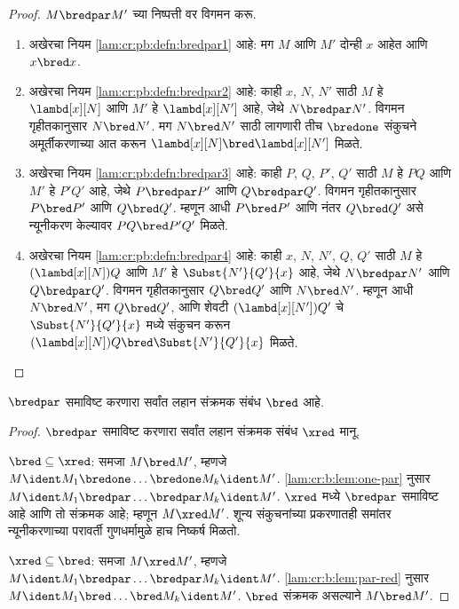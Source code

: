 \begin{proof} $M \bredpar M'$ च्या निष्पत्ती वर विगमन करू.
  \begin{enumerate}
  \item अखेरचा नियम \ref{lam:cr:pb:defn:bredpar1} आहे: मग $M$
    आणि $M'$ दोन्ही $x$ आहेत आणि $x \bred x$.
  \item अखेरचा नियम \ref{lam:cr:pb:defn:bredpar2} आहे: काही
    $x$, $N$, $N'$ साठी $M$ हे $\lambd[x][N]$
    आणि $M'$ हे $\lambd[x][N']$ आहे, जेथे
    $N \bredpar N'$. विगमन गृहीतकानुसार $N \bred N'$.
    मग $N \bred N'$ साठी लागणारी तीच $\bredone$
    संकुचने अमूर्तीकरणाच्या आत करून
    $\lambd[x][N] \bred \lambd[x][N']$ मिळते.
  \item अखेरचा नियम \ref{lam:cr:pb:defn:bredpar3} आहे: काही
    $P$, $Q$, $P'$, $Q'$ साठी $M$ हे $PQ$ आणि
    $M'$ हे $P'Q'$ आहे, जेथे $P \bredpar P'$
    आणि $Q \bredpar Q'$. विगमन गृहीतकानुसार
    $P \bred P'$ आणि $Q \bred Q'$. म्हणून आधी
    $P \bred P'$ आणि नंतर $Q \bred Q'$ असे
    न्यूनीकरण केल्यावर $PQ \bred P'Q'$ मिळते.
  \item अखेरचा नियम \ref{lam:cr:pb:defn:bredpar4} आहे: काही
    $x$, $N$, $N'$, $Q$, $Q'$ साठी $M$ हे
    $(\lambd[x][N])Q$ आणि $M'$ हे
    $\Subst{N'}{Q'}{x}$ आहे, जेथे $N \bredpar N'$
    आणि $Q \bredpar Q'$. विगमन गृहीतकानुसार
    $Q \bred Q'$ आणि $N \bred N'$. म्हणून आधी
    $N \bred N'$, मग $Q \bred Q'$, आणि शेवटी
    $(\lambd[x][N'])Q'$ चे $\Subst{N'}{Q'}{x}$
    मध्ये संकुचन करून
    $(\lambd[x][N])Q \bred \Subst{N'}{Q'}{x}$ मिळते.
  \end{enumerate}
\end{proof}

\begin{lem}\label{lam:cr:b:lem:str}
  $\bredpar$ समाविष्ट करणारा सर्वांत लहान संक्रमक
  संबंध $\bred$ आहे.
\end{lem}

\begin{proof}
  $\bredpar$ समाविष्ट करणारा सर्वांत लहान संक्रमक
  संबंध $\xred$ मानू.

  $\bred \subseteq \xred$: समजा $M \bred M'$,
  म्हणजे $M \ident M_1 \bredone \dots \bredone M_k \ident M'$.
  \ref{lam:cr:b:lem:one-par} नुसार $M \ident M_1 \bredpar
  \dots \bredpar M_k \ident M'$. $\xred$ मध्ये
  $\bredpar$ समाविष्ट आहे आणि तो संक्रमक आहे;
  म्हणून $M \xred M'$. शून्य संकुचनांच्या प्रकरणातही
  समांतर न्यूनीकरणाच्या परावर्ती गुणधर्मामुळे हाच निष्कर्ष मिळतो.

  $\xred \subseteq \bred$: समजा $M \xred M'$,
  म्हणजे $M \ident M_1 \bredpar \dots \bredpar M_k \ident M'$.
  \ref{lam:cr:b:lem:par-red} नुसार $M \ident M_1 \bred
  \dots \bred M_k \ident M'$. $\bred$ संक्रमक
  असल्याने $M \bred M'$.
\end{proof}


